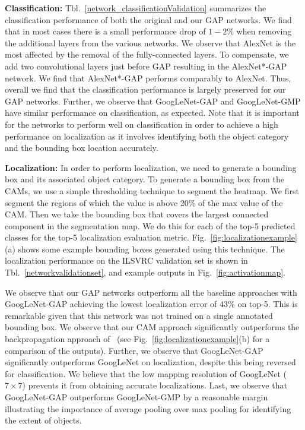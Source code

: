 \documentclass[10pt,twocolumn,letterpaper]{article}
\begin{document}
\textbf{Classification:} Tbl.~\ref{network_classificationValidation} summarizes the classification performance of both the original and our GAP networks. We find that in most cases there is a small performance drop of $1 - 2\%$ when removing the additional layers from the various networks. We observe that AlexNet is the most affected by the removal of the fully-connected layers. To compensate, we add two convolutional layers just before GAP resulting in the AlexNet*-GAP network. We find that AlexNet*-GAP performs comparably to AlexNet. Thus, overall we find that the classification performance is largely preserved for our GAP networks. Further, we observe that GoogLeNet-GAP and GoogLeNet-GMP have similar performance on classification, as expected. Note that it is important for the networks to perform well on classification in order to achieve a high performance on localization as it involves identifying both the object category and the bounding box location accurately.

\textbf{Localization:} In order to perform localization, we need to generate a bounding box and its associated object category. To generate a bounding box from the CAMs, we use a simple thresholding technique to segment the heatmap. We first segment the regions of which the value is above 20\% of the max value of the CAM. Then we take the bounding box that covers the largest connected component in the segmentation map. We do this for each of the top-5 predicted classes for the top-5 localization evaluation metric. Fig.~\ref{fig:localizationexample}(a) shows some example bounding boxes generated using this technique. The localization performance on the ILSVRC validation set is shown in Tbl.~\ref{networkvalidationset}, and example outputs in Fig.~\ref{fig:activationmap}.

We observe that our GAP networks outperform all the baseline approaches with GoogLeNet-GAP achieving the lowest localization error of $43\%$ on top-5. This is remarkable given that this network was not trained on a single annotated bounding box. We observe that our CAM approach significantly outperforms the backpropagation approach of~\cite{simonyan2013deep} (see Fig.~\ref{fig:localizationexample}(b) for a comparison of the outputs). Further, we observe that GoogLeNet-GAP significantly outperforms GoogLeNet on localization, despite this being reversed for classification. We believe that the low mapping resolution of GoogLeNet ($7\times7$) prevents it from obtaining accurate localizations. Last, we observe that GoogLeNet-GAP outperforms GoogLeNet-GMP by a reasonable margin illustrating the importance of average pooling over max pooling for identifying the extent of objects.
\end{document}
